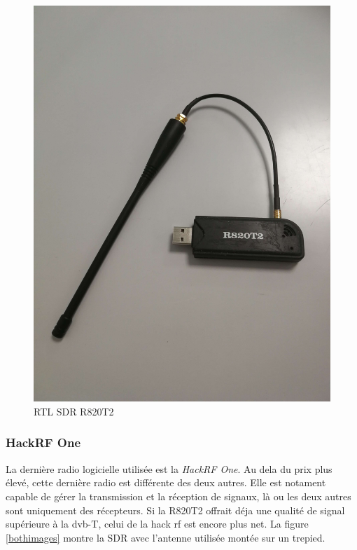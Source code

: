 \begin{figure}[h]
\centering

\includegraphics[scale=0.08]{images/r820t2.png}
\caption{RTL SDR R820T2}\label{term32}
\end{figure}




\subsubsection{HackRF One}

La dernière radio logicielle utilisée est la \textit{HackRF One}. Au dela du prix plus élevé, cette dernière radio est différente des deux autres. Elle est notament capable de gérer la transmission et la réception de signaux, là ou les deux autres sont uniquement des récepteurs. Si la R820T2 offrait déja une qualité de signal supérieure à la dvb-T, celui de la hack rf est encore plus net. La figure \ref{bothimages} montre la SDR avec l'antenne utilisée montée sur un trepied.

